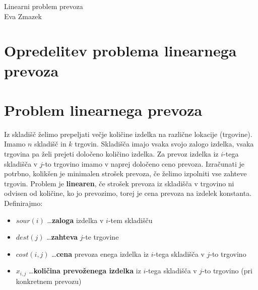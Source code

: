 \documentclass[12pt,a4paper,twoside]{article}
\theoremstyle{definition} %
\theoremstyle{plain} %
\numberwithin{equation}{section}  %
\begin{document}
\thispagestyle{empty} %



\begin{titlepage}\centering
{}
\vspace*{\fill}
{\LARGE Linearni problem prevoza} \\[1cm]
\large Eva Zmazek
\vspace*{\fill}
\vfill
{}
\end{titlepage}

\cleardoublepage


\section{Opredelitev problema linearnega prevoza}

\section{Problem linearnega prevoza}

Iz skladišč želimo prepeljati večje količine izdelka na različne lokacije (trgovine). Imamo $n$ skladišč in $k$ trgovin. Skladišča imajo vsaka svojo zalogo izdelka, vsaka trgovina pa želi prejeti določeno količino izdelka. Za prevoz izdelka iz $i$-tega skladišča v $j$-to trgovino imamo v naprej določeno ceno prevoza. Izračunati je potrbno, kolikšen je minimalen strošek prevoza, če želimo izpolniti vse zahteve trgovin. Problem je \textbf{linearen}, če strošek prevoza iz skladišča v trgovino ni odvisen od količine, ko jo prevozimo, torej je cena prevoza na izdelek konstanta. \\

Definirajmo:
\begin{itemize}
\item $sour(i)$ \dots \textbf{zaloga} izdelka v $i$-tem skladišču
\item $dest(j)$ \dots \textbf{zahteva} $j$-te trgovine
\item $cost(i,j)$ \dots \textbf{cena} prevoza enega izdelka iz $i$-tega skladišča v $j$-to trgovino
\item $x_{i,j}$ \dots \textbf{količina prevoženega izdelka} iz $i$-tega skladišča v $j$-to trgovino (pri konkretnem prevozu)
\end{itemize}
\end{document}
